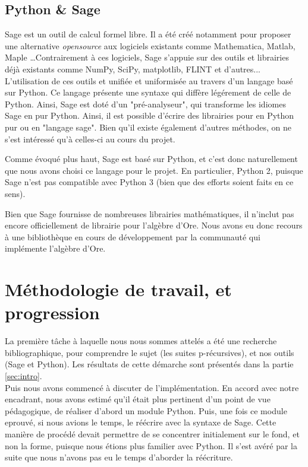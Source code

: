 \documentclass[final,12pt]{article}
\begin{document}
    \subsection{Python \& Sage}
        \label{ssec:sage}
        \par Sage est un outil de calcul formel libre.
        Il a été créé notamment pour proposer
        une alternative \textit{opensource} aux logiciels existants comme Mathematica,
        Matlab, Maple \ldots Contrairement à ces logiciels, Sage s'appuie sur des outils
        et librairies déjà existants comme NumPy, SciPy, matplotlib, FLINT et d'autres...
        L'utilisation de ces outils et unifiée et uniformisée au travers d'un langage
        basé sur Python. Ce langage présente une syntaxe qui diffère légérement de celle
        de Python. Ainsi, Sage est doté d'un "pré-analyseur",
        qui transforme les idiomes Sage en pur Python.
        Ainsi, il est possible d'écrire des librairies pour en Python pur ou en "langage sage".
        Bien qu'il existe également d'autres méthodes, on ne s'est intéressé qu'à celles-ci au
        cours du projet.
        \par Comme évoqué plus haut, Sage est basé sur Python, et c'est donc naturellement
        que nous avons choisi ce langage pour le projet.
        En particulier, Python 2, puisque Sage n'est pas compatible avec Python 3
        (bien que des efforts soient faits en ce sens).
        \par Bien que Sage fournisse de nombreuses librairies mathématiques,
        il n'inclut pas encore officiellement de librairie pour l'algèbre d'Ore.
        Nous avons eu donc recours à une bibliothèque en cours de développement par
        la communauté qui implémente l'algèbre d'Ore. %
\section{Méthodologie de travail, et progression}
    \label{sec:methodo}
    \par La première tâche à laquelle nous nous sommes attelés a été une recherche bibliographique,
    pour comprendre le sujet (les suites p-récursives), et nos outils (Sage et Python).
    Les résultats de cette démarche sont présentés dans la partie \ref{sec:intro}.\\
    Puis nous avons commencé à discuter de l'implémentation. En accord avec notre encadrant,
    nous avons estimé qu'il était plus pertinent d'un point de vue pédagogique, de réaliser
    d'abord un module Python. Puis, une fois ce module eprouvé, si nous avions le temps,
    le réécrire avec la syntaxe de Sage. Cette manière de procédé devait permettre de se
    concentrer initialement sur le fond, et non la forme, puisque nous étions plus familier
    avec Python. {\color{blue} Il s'est avéré par la suite que nous n'avons pas eu le temps
    d'aborder la réécriture}.
\end{document}

